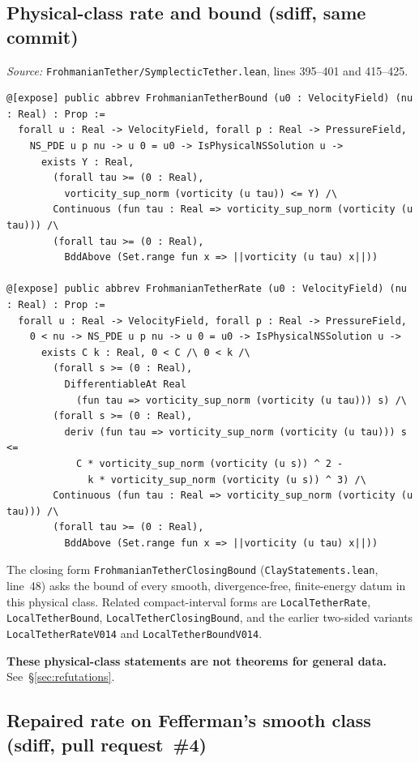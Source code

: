 \documentclass[11pt]{article}
\theoremstyle{plain}
\theoremstyle{definition}
\theoremstyle{remark}
\begin{document}
\subsection{Physical-class rate and bound (sdiff, same commit)}

\textit{Source:} \texttt{FrohmanianTether/\hspace{0pt}SymplecticTether.\hspace{0pt}lean}, lines 395--401 and 415--425.
\begin{lstlisting}
@[expose] public abbrev FrohmanianTetherBound (u0 : VelocityField) (nu : Real) : Prop :=
  forall u : Real -> VelocityField, forall p : Real -> PressureField,
    NS_PDE u p nu -> u 0 = u0 -> IsPhysicalNSSolution u ->
      exists Y : Real,
        (forall tau >= (0 : Real),
          vorticity_sup_norm (vorticity (u tau)) <= Y) /\
        Continuous (fun tau : Real => vorticity_sup_norm (vorticity (u tau))) /\
        (forall tau >= (0 : Real),
          BddAbove (Set.range fun x => ||vorticity (u tau) x||))

@[expose] public abbrev FrohmanianTetherRate (u0 : VelocityField) (nu : Real) : Prop :=
  forall u : Real -> VelocityField, forall p : Real -> PressureField,
    0 < nu -> NS_PDE u p nu -> u 0 = u0 -> IsPhysicalNSSolution u ->
      exists C k : Real, 0 < C /\ 0 < k /\
        (forall s >= (0 : Real),
          DifferentiableAt Real
            (fun tau => vorticity_sup_norm (vorticity (u tau))) s) /\
        (forall s >= (0 : Real),
          deriv (fun tau => vorticity_sup_norm (vorticity (u tau))) s <=
            C * vorticity_sup_norm (vorticity (u s)) ^ 2 -
              k * vorticity_sup_norm (vorticity (u s)) ^ 3) /\
        Continuous (fun tau : Real => vorticity_sup_norm (vorticity (u tau))) /\
        (forall tau >= (0 : Real),
          BddAbove (Set.range fun x => ||vorticity (u tau) x||))
\end{lstlisting}
The closing form \texttt{FrohmanianTetherClosingBound} (\texttt{ClayStatements.\hspace{0pt}lean}, line~48) asks the bound of every smooth, divergence-free, finite-energy datum in this physical class. Related compact-interval forms are \texttt{LocalTetherRate}, \texttt{LocalTetherBound}, \texttt{LocalTetherClosingBound}, and the earlier two-sided variants \texttt{LocalTetherRateV014} and \texttt{LocalTetherBoundV014}.

\textbf{These physical-class statements are not theorems for general data.} See~\S\ref{sec:refutations}.

\subsection{Repaired rate on Fefferman's smooth class (sdiff, pull request~\#4)}
\label{sec:rate-smooth}
\end{document}
